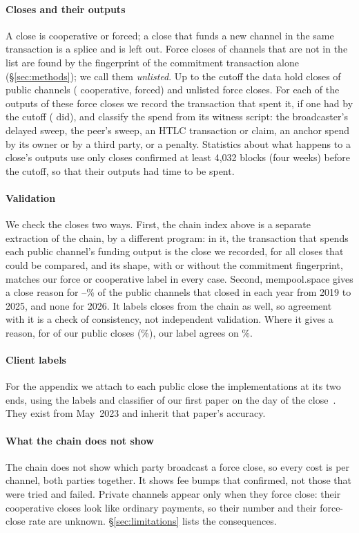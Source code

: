 \paragraph{Closes and their outputs}
A close is cooperative or forced; a close that funds a new channel in the same transaction is a splice and is left
out. Force closes of channels that are not in the list are found by the fingerprint of the commitment transaction
alone (\S\ref{sec:methods}); we call them \emph{unlisted}. Up to the cutoff the data hold \NPublicCloses{} closes of
public channels (\NPublicMutual{} cooperative, \NPublicForce{} forced) and \NUnlistedForce{} unlisted force closes.
For each of the \NOutputs{} outputs of these \NForceAll{} force closes we record the transaction that spent it, if one
had by the cutoff (\NOutputsSpent{} did), and classify the spend from its witness script: the broadcaster's delayed
sweep, the peer's sweep, an HTLC transaction or claim, an anchor spend by its owner or by a third party, or a penalty.
Statistics about what happens to a close's outputs use only closes confirmed at least 4,032 blocks (four weeks) before
the cutoff, so that their outputs had time to be spent.

\paragraph{Validation}
We check the closes two ways. First, the chain index above is a separate extraction of the chain, by a different
program: in it, the transaction that spends each public channel's funding output is the close we recorded, for all
\ValLakeCompared{} closes that could be compared, and its shape, with or without the commitment fingerprint, matches
our force or cooperative label in every case. Second, mempool.space gives a close reason for
\ValCoverageYearMinPct--\ValCoverageYearMaxPct\% of the public channels that closed in each year from 2019 to 2025,
and none for 2026. It labels closes from the chain as well, so agreement with it is a check
of consistency, not independent validation. Where it gives a reason, for \ValCompared{} of our public closes
(\ValCoveragePct\%), our label agrees on \ValAgreePct\%.

\paragraph{Client labels}
For the appendix we attach to each public close the implementations at its two ends, using the labels and
classifier of our first paper on the day of the close~\cite{kumar2026clientdiversity}. They exist from May~2023 and
inherit that paper's accuracy.

\paragraph{What the chain does not show}
The chain does not show which party broadcast a force close, so every cost is per channel, both parties together. It
shows fee bumps that confirmed, not those that were tried and failed. Private channels appear only when they force
close: their cooperative closes look like ordinary payments, so their number and their force-close rate are unknown.
\S\ref{sec:limitations} lists the consequences.
